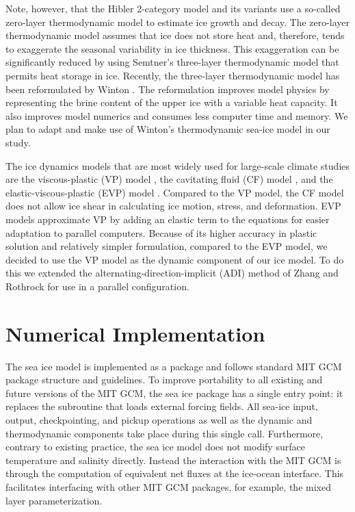 Note, however, that the Hibler 2-category model and its variants use a
so-called zero-layer thermodynamic model to estimate ice growth and
decay.  The zero-layer thermodynamic model assumes that ice does not
store heat and, therefore, tends to exaggerate the seasonal
variability in ice thickness.  This exaggeration can be significantly
reduced by using Semtner's \cite{sem76} three-layer thermodynamic
model that permits heat storage in ice.  Recently, the three-layer
thermodynamic model has been reformulated by Winton \cite{win00}.  The
reformulation improves model physics by representing the brine content
of the upper ice with a variable heat capacity.  It also improves
model numerics and consumes less computer time and memory.  We plan to
adapt and make use of Winton's thermodynamic sea-ice model in our
study.

The ice dynamics models that are most widely used for large-scale
climate studies are the viscous-plastic (VP) model \cite{hib79}, the
cavitating fluid (CF) model \cite{fla92}, and the
elastic-viscous-plastic (EVP) model \cite{hun97}.  Compared to the VP
model, the CF model does not allow ice shear in calculating ice
motion, stress, and deformation.  EVP models approximate VP by adding
an elastic term to the equations for easier adaptation to parallel
computers.  Because of its higher accuracy in plastic solution and
relatively simpler formulation, compared to the EVP model, we decided
to use the VP model as the dynamic component of our ice model.  To do
this we extended the alternating-direction-implicit (ADI) method of
Zhang and Rothrock \cite{zha00} for use in a parallel configuration.

\section{Numerical Implementation}

The sea ice model is implemented as a package and follows standard MIT
GCM package structure and guidelines.  To improve portability to all
existing and future versions of the MIT GCM, the sea ice package has a
single entry point: it replaces the subroutine that loads external
forcing fields.  All sea-ice input, output, checkpointing, and pickup
operations as well as the dynamic and thermodynamic components take
place during this single call.  Furthermore, contrary to existing
practice, the sea ice model does not modify surface temperature and
salinity directly.  Instead the interaction with the MIT GCM is
through the computation of equivalent net fluxes at the ice-ocean
interface.  This facilitates interfacing with other MIT GCM packages,
for example, the mixed layer parameterization.

